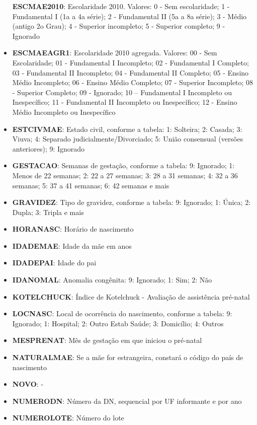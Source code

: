 \documentclass[
]{article}
\begin{document}
\begin{itemize}
  \textbf{ESCMAE2010}: Escolaridade 2010. Valores: 0 - Sem escolaridade;
  1 - Fundamental I (1a a 4a série); 2 - Fundamental II (5a a 8a série);
  3 - Médio (antigo 2o Grau); 4 - Superior incompleto; 5 - Superior
  completo; 9 - Ignorado
\item
  \textbf{ESCMAEAGR1}: Escolaridade 2010 agregada. Valores: 00 - Sem
  Escolaridade; 01 - Fundamental I Incompleto; 02 - Fundamental I
  Completo; 03 - Fundamental II Incompleto; 04 - Fundamental II
  Completo; 05 - Ensino Médio Incompleto; 06 - Ensino Médio Completo; 07
  - Superior Incompleto; 08 - Superior Completo; 09 - Ignorado; 10 --
  Fundamental I Incompleto ou Inespecífico; 11 - Fundamental II
  Incompleto ou Inespecífico; 12 - Ensino Médio Incompleto ou
  Inespecífico
\item
  \textbf{ESTCIVMAE}: Estado civil, conforme a tabela: 1: Solteira; 2:
  Casada; 3: Viuva; 4: Separado judicialmente/Divorciado; 5: União
  consensual (versões anteriores); 9: Ignorado
\item
  \textbf{GESTACAO}: Semanas de gestação, conforme a tabela: 9:
  Ignorado; 1: Menos de 22 semanas; 2: 22 a 27 semanas; 3: 28 a 31
  semanas; 4: 32 a 36 semanas; 5: 37 a 41 semanas; 6: 42 semanas e mais
\item
  \textbf{GRAVIDEZ}: Tipo de gravidez, conforme a tabela: 9: Ignorado;
  1: Única; 2: Dupla; 3: Tripla e mais
\item
  \textbf{HORANASC}: Horário de nascimento
\item
  \textbf{IDADEMAE}: Idade da mãe em anos
\item
  \textbf{IDADEPAI}: Idade do pai
\item
  \textbf{IDANOMAL}: Anomalia congênita: 9: Ignorado; 1: Sim; 2: Não
\item
  \textbf{KOTELCHUCK}: Índice de Kotelchuck - Avaliação de assistência
  pré-natal
\item
  \textbf{LOCNASC}: Local de ocorrência do nascimento, conforme a
  tabela: 9: Ignorado; 1: Hospital; 2: Outro Estab Saúde; 3: Domicílio;
  4: Outros
\item
  \textbf{MESPRENAT}: Mês de gestação em que iniciou o pré‐natal
\item
  \textbf{NATURALMAE}: Se a mãe for estrangeira, constará o código do
  país de nascimento
\item
  \textbf{NOVO}: -
\item
  \textbf{NUMERODN}: Número da DN, sequencial por UF informante e por
  ano
\item
  \textbf{NUMEROLOTE}: Número do lote

\end{itemize}
\end{document}
